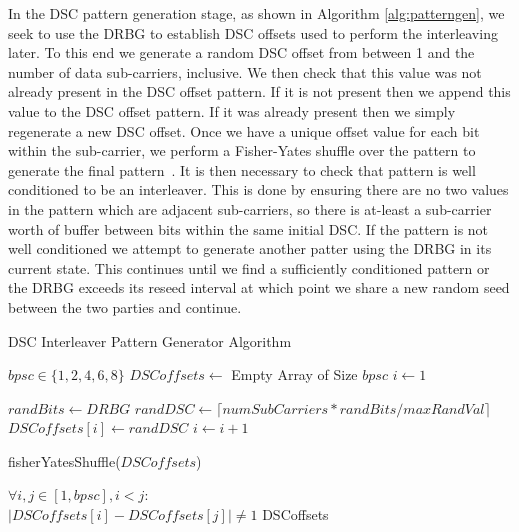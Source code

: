 \documentclass[sigconf]{acmart}
\begin{document}
In the DSC pattern generation stage, as shown in Algorithm \ref{alg:patterngen}, we seek to use the DRBG to establish DSC offsets used to perform the interleaving later. To this end we generate a random DSC offset from between 1 and the number of data sub-carriers, inclusive. We then check that this value was not already present in the DSC offset pattern. If it is not present then we append this value to the DSC offset pattern. If it was already present then we simply regenerate a new DSC offset. Once we have a unique offset value for each bit within the sub-carrier, we perform a Fisher-Yates shuffle over the pattern to generate the final pattern~\cite{fisher1943statistical}. It is then necessary to check that pattern is well conditioned to be an interleaver. This is done by ensuring there are no two values in the pattern which are adjacent sub-carriers, so there is at-least a sub-carrier worth of buffer between bits within the same initial DSC. If the pattern is not well conditioned we attempt to generate another patter using the DRBG in its current state. This continues until we find a sufficiently conditioned pattern or the DRBG exceeds its reseed interval at which point we share a new random seed between the two parties and continue.

\begin{algorithm}[ht]
\caption{DSC Interleaver Pattern Generator Algorithm}
\label{alg:patterngen}
\begin{algorithmic}

\REQUIRE $bpsc \in \{1,2,4,6,8\}$
\STATE $DSCoffsets \leftarrow $ Empty Array of Size $bpsc$
\STATE $i \leftarrow 1$
\STATE

    \STATE $randBits \leftarrow DRBG$
    \STATE $randDSC \leftarrow \lceil numSubCarriers * randBits / maxRandVal \rceil$
        \STATE $DSCoffsets[i] \leftarrow randDSC$
        \STATE $i \leftarrow i + 1$
    \ENDIF
\ENDWHILE
\STATE

\STATE fisherYatesShuffle($DSCoffsets$)
\STATE 

\ENSURE $\forall i,j \in [1, bpsc], i < j:$ \\ $|DSCoffsets[i]-DSCoffsets[j]| \neq 1$
\RETURN DSCoffsets
\end{algorithmic}
\end{algorithm}
\end{document}
